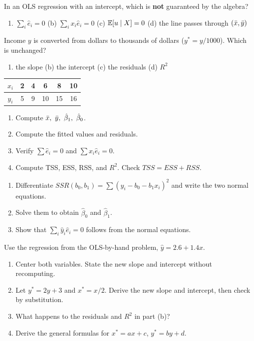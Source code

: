 \documentclass[11pt]{article}
\begin{document}
In an OLS regression with an intercept, which is \textbf{not} guaranteed by the algebra?
\begin{enumerate}[label=(\alph*)]
  \item $\sum_i\hat e_i=0$ \quad (b) $\sum_i x_i\hat e_i=0$ \quad (c) $\mathbb{E}[u\mid X]=0$ \quad (d) the line passes through $(\bar{x},\bar{y})$
\end{enumerate}

Income $y$ is converted from dollars to thousands of dollars ($y^*=y/1000$). Which is unchanged?
\begin{enumerate}[label=(\alph*)]
  \item the slope \quad (b) the intercept \quad (c) the residuals \quad (d) $R^2$
\end{enumerate}

\begin{center}
\begin{tabular}{c|ccccc}
$x_i$ & 2 & 4 & 6 & 8 & 10 \\ \hline
$y_i$ & 5 & 9 & 10 & 15 & 16
\end{tabular}
\end{center}
\begin{enumerate}[label=(\alph*)]
  \item Compute $\xbar,\ \ybar,\ \hat\beta_1,\ \hat\beta_0$.
  \item Compute the fitted values and residuals.
  \item Verify $\sum\hat e_i=0$ and $\sum x_i\hat e_i=0$.
  \item Compute TSS, ESS, RSS, and $R^2$. Check $TSS=ESS+RSS$.
\end{enumerate}

\begin{enumerate}[label=(\alph*)]
  \item Differentiate $SSR(b_0,b_1)=\sum(y_i-b_0-b_1x_i)^2$ and write the two normal equations.
  \item Solve them to obtain $\hat\beta_0$ and $\hat\beta_1$.
  \item Show that $\sum_i\hat y_i\hat e_i=0$ follows from the normal equations.
\end{enumerate}

Use the regression from the OLS-by-hand problem, $\hat y=2.6+1.4x$.
\begin{enumerate}[label=(\alph*)]
  \item Center both variables. State the new slope and intercept without recomputing.
  \item Let $y^*=2y+3$ and $x^*=x/2$. Derive the new slope and intercept, then check by substitution.
  \item What happens to the residuals and $R^2$ in part (b)?
  \item Derive the general formulas for $x^*=ax+c$, $y^*=by+d$.
\end{enumerate}
\end{document}

